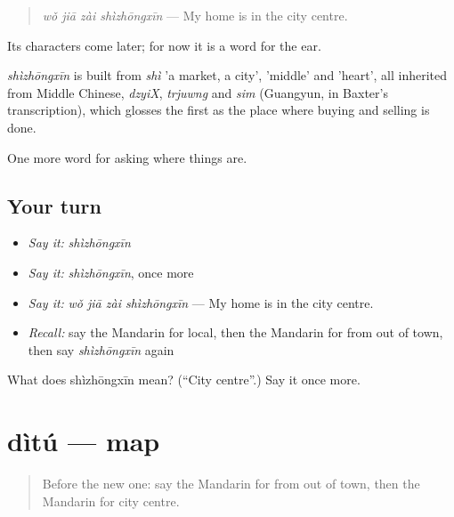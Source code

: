 \begin{quote}
\emph{wǒ jiā zài shìzhōngxīn} — My home is in the city centre.
\end{quote}

Its characters come later; for now it is a word for the ear.

\begin{cousinweb}
\emph{shìzhōngxīn} is built from \emph{shì} 'a market, a city',  'middle' and  'heart', all inherited from Middle Chinese, \emph{dzyiX}, \emph{trjuwng} and \emph{sim} (Guangyun, in Baxter's transcription), which glosses the first as the place where buying and selling is done.
\end{cousinweb}

\begin{grammarlens}[title={What you've built}]
One more word for asking where things are.
\end{grammarlens}

\subsection*{Your turn}
\begin{itemize}
\raggedright
  \item \emph{Say it:} \emph{shìzhōngxīn}
  \item \emph{Say it:} \emph{shìzhōngxīn}, once more
  \item \emph{Say it:} \emph{wǒ jiā zài shìzhōngxīn} — My home is in the city centre.
  \item \emph{Recall:} say the Mandarin for local, then the Mandarin for from out of town, then say \emph{shìzhōngxīn} again
\end{itemize}

\begin{tcolorbox}[breakable,colback=teal!4,colframe=teal!35!black,title={Before you move on}]
What does shìzhōngxīn mean? (\textquotedblleft{}City centre\textquotedblright{}.) Say it once more.
\end{tcolorbox}
\section[dìtú]{dìtú — map}

\label{lesson:ZH-C211-ditu}



\begin{quote}
Before the new one: say the Mandarin for from out of town, then the Mandarin for city centre.
\end{quote}


